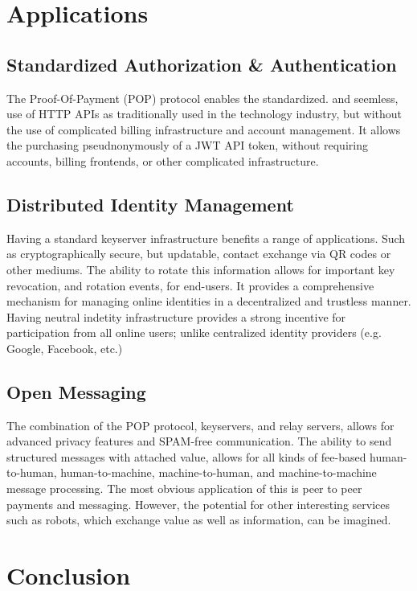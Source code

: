 \documentclass{article}
\begin{document}
\section{Applications}

\subsection{Standardized Authorization \& Authentication}

The Proof-Of-Payment (POP) protocol enables the standardized. and seemless, use of HTTP APIs as traditionally used in the technology industry, but without the use of complicated billing infrastructure and account management. It allows the purchasing pseudnonymously of a JWT API token, without requiring accounts, billing frontends, or other complicated infrastructure.

\subsection{Distributed Identity Management}

Having a standard keyserver infrastructure benefits a range of applications. Such as cryptographically secure, but updatable, contact exchange via QR codes or other mediums. The ability to rotate this information allows for important key revocation, and rotation events, for end-users. It provides a comprehensive mechanism for managing online identities in a decentralized and trustless manner. Having neutral indetity infrastructure provides a strong incentive for participation from all online users; unlike centralized identity providers (e.g. Google, Facebook, etc.)

\subsection{Open Messaging}

The combination of the POP protocol, keyservers, and relay servers, allows for advanced privacy features and SPAM-free communication. The ability to send structured messages with attached value, allows for all kinds of fee-based human-to-human, human-to-machine, machine-to-human, and machine-to-machine message processing. The most obvious application of this is peer to peer payments and messaging. However, the potential for other interesting services such as robots, which exchange value as well as information, can be imagined.

\section{Conclusion}
\end{document}
